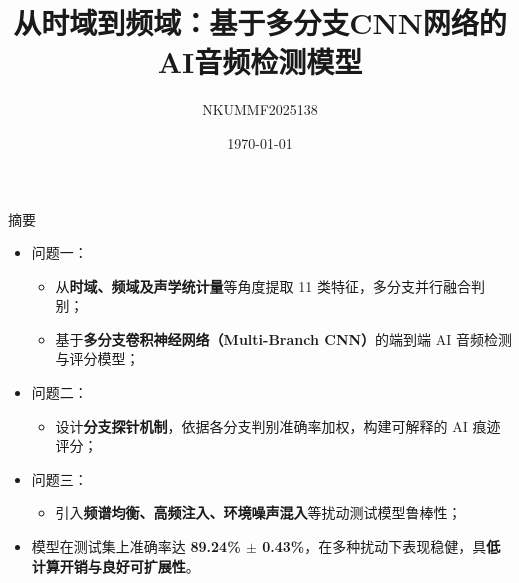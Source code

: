 \documentclass[aspectratio=169]{beamer}
\title{从时域到频域：基于多分支CNN网络的AI音频检测模型}
\author{NKUMMF2025138}
\date{\today}
\begin{document}
\begin{frame}
  \titlepage
\end{frame}


\begin{frame}{摘要}
\small
\begin{itemize}
  \item 问题一：
    \begin{itemize}
      \item 从\textbf{时域、频域及声学统计量}等角度提取 11 类特征，多分支并行融合判别；
      \item 基于\textbf{多分支卷积神经网络（Multi-Branch CNN）}的端到端 AI 音频检测与评分模型；
    \end{itemize}

  \item 问题二：
    \begin{itemize}
      \item 设计\textbf{分支探针机制}，依据各分支判别准确率加权，构建可解释的 AI 痕迹评分；
    \end{itemize}

  \item 问题三：
    \begin{itemize}
      \item 引入\textbf{频谱均衡、高频注入、环境噪声混入}等扰动测试模型鲁棒性；
    \end{itemize}
  \vspace{0.8cm}
  \item 模型在测试集上准确率达 \textbf{89.24\% $\pm$ 0.43\%}，在多种扰动下表现稳健，具\textbf{低计算开销与良好可扩展性}。
\end{itemize}
\end{frame}
\end{document}
